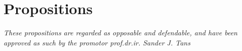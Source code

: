 


    

\chapter*{Propositions}

\textit{These propositions are regarded as opposable and defendable, and have
    been approved as such by the promotor prof.dr.ir. Sander J. Tans}


